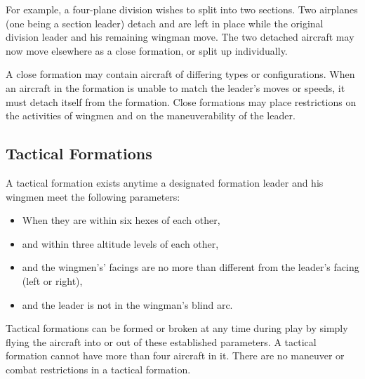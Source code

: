 \begin{advancedrules}
For example, a four-plane division wishes to split into two sections. Two airplanes (one being a section leader) detach and are left in place while the original division leader and his remaining wingman move. The two detached aircraft may now move elsewhere as a close formation, or split up individually.

A close formation may contain aircraft of differing types or configurations. When an aircraft in the formation is unable to match the leader's moves or speeds, it must detach itself from the formation. Close formations may place restrictions on the activities of wingmen and on the maneuverability of the leader.

\subsection{Tactical Formations}

A tactical formation exists anytime a designated formation leader and his wingmen meet the following parameters:

\begin{itemize}
    \item When they are within six hexes of each other,
    \item and within three altitude levels of each other,
    \item and the wingmen’s' facings are no more than  different from the leader's facing (left or right),
    \item and the leader is not in the wingman's blind arc.
\end{itemize}

Tactical formations can be formed or broken at any time during play by simply flying the aircraft into or out of these established parameters. A tactical formation cannot have more than four aircraft in it. There are no maneuver or combat restrictions in a tactical formation.

\end{advancedrules}